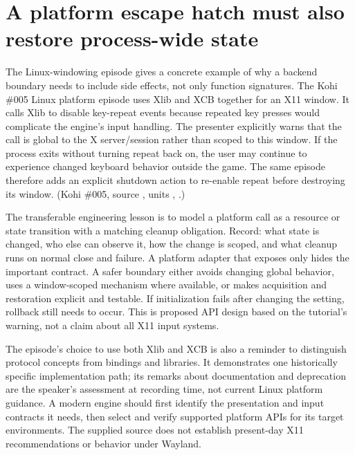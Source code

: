 \section{A platform escape hatch must also restore process-wide state}\label{05-engine-i-ch024-a-platform-escape-hatch-must-also-restore-process-wide-state}

\hypertarget{05-engine-i-ch024-a-platform-escape-hatch-must-also-restore-process-wide-state}{}

The Linux-windowing episode gives a concrete example of why a backend boundary needs to include side effects, not only function signatures. The Kohi \#005 Linux platform episode uses Xlib and XCB together for an X11 window. It calls Xlib to disable key-repeat events because repeated key presses would complicate the engine's input handling. The presenter explicitly warns that the call is global to the X server/session rather than scoped to this window. If the process exits without turning repeat back on, the user may continue to experience changed keyboard behavior outside the game. The same episode therefore adds an explicit shutdown action to re-enable repeat before destroying its window. (Kohi \#005, source , units , .)

The transferable engineering lesson is to model a platform call as a resource or state transition with a matching cleanup obligation. Record: what state is changed, who else can observe it, how the change is scoped, and what cleanup runs on normal close and failure. A platform adapter that exposes only  hides the important contract. A safer boundary either avoids changing global behavior, uses a window-scoped mechanism where available, or makes acquisition and restoration explicit and testable. If initialization fails after changing the setting, rollback still needs to occur. This is proposed API design based on the tutorial's warning, not a claim about all X11 input systems.

The episode's choice to use both Xlib and XCB is also a reminder to distinguish protocol concepts from bindings and libraries. It demonstrates one historically specific implementation path; its remarks about documentation and deprecation are the speaker's assessment at recording time, not current Linux platform guidance. A modern engine should first identify the presentation and input contracts it needs, then select and verify supported platform APIs for its target environments. The supplied source does not establish present-day X11 recommendations or behavior under Wayland.

